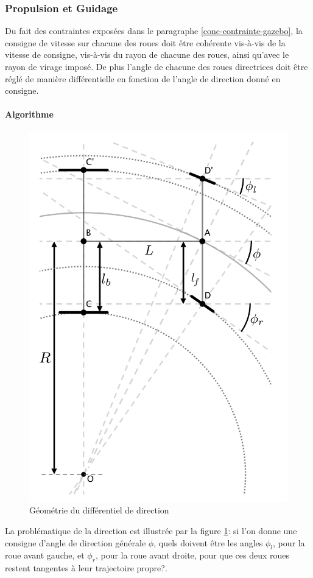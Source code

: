 \documentclass[12pt,a4paper]{report}
\begin{document}
		\subsubsection{Propulsion et Guidage}
		
			Du fait des contraintes exposées dans le paragraphe \ref{conc-contrainte-gazebo}, la consigne de vitesse sur chacune des roues doit être cohérente vis-à-vis de la vitesse de consigne, vis-à-vis du rayon de chacune des roues, ainsi qu'avec le rayon de virage imposé. De plus l'angle de chacune des roues directrices doit être réglé de manière différentielle en fonction de l'angle de direction donné en consigne.
			
			\paragraph{Algorithme}
			\label{algo-steering}
			
			\begin{figure}[!]
				\centering
				\includegraphics[width=0.7\linewidth]{img/ackermann}
				\caption[Géométrie Différentiel]{Géométrie du différentiel de direction}
				\label{fig:ackermann}
			\end{figure}
		
			\para La problématique de la direction est illustrée par la figure \ref{fig:ackermann}: si l'on donne une consigne d'angle de direction générale $\phi$, quels doivent être les angles $\phi_l$, pour la roue avant gauche, et $\phi_r$, pour la roue avant droite, pour que ces deux roues restent tangentes à leur trajectoire propre?.
			
\end{document}
